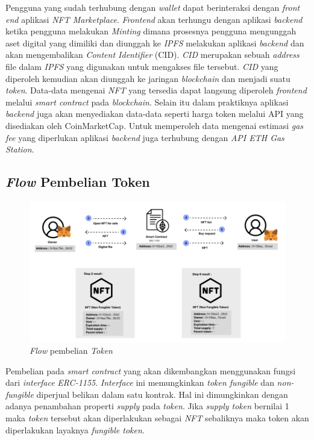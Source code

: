 Pengguna yang sudah terhubung dengan \emph{wallet} dapat berinteraksi dengan \emph{front end} aplikasi \emph{NFT Marketplace}. \emph{Frontend} akan terhungu dengan aplikasi \emph{backend} ketika pengguna melakukan \emph{Minting} dimana prosesnya pengguna mengunggah aset digital yang dimiliki dan diunggah ke \emph{IPFS} melakukan aplikasi \emph{backend} dan akan mengembalikan \emph{Content Identifier} (CID). \emph{CID} merupakan sebuah \emph{address} file dalam \emph{IPFS} yang digunakan untuk mengakses file tersebut. \emph{CID} yang diperoleh kemudian akan diunggah ke jaringan \emph{blockchain} dan menjadi suatu \emph{token}. Data-data mengenai \emph{NFT} yang tersedia dapat langsung diperoleh \emph{frontend} melalui \emph{smart contract} pada \emph{blockchain}. Selain itu dalam praktiknya aplikasi \emph{backend} juga akan menyediakan data-data seperti harga token melalui API yang disediakan oleh CoinMarketCap. Untuk memperoleh data mengenai estimasi \emph{gas fee} yang diperlukan aplikasi \emph{backend} juga terhubung dengan \emph{API ETH Gas Station}.

\subsection{\emph{Flow} Pembelian Token}

\begin{figure} [H] \centering
  \includegraphics[scale=0.45]{gambar/img-nft-buy.png}
  \caption{\emph{Flow} pembelian \emph{Token}}
  \label{fig:Buy}
\end{figure}

Pembelian pada \emph{smart contract} yang akan dikembangkan menggunakan fungsi dari \emph{interface} \emph{ERC-1155}. \emph{Interface} ini memungkinkan \emph{token fungible} dan \emph{non-fungible} diperjual belikan dalam satu kontrak. Hal ini dimungkinkan dengan adanya penambahan properti \emph{supply} pada \emph{token}. Jika \emph{supply token} bernilai 1 maka \emph{token} tersebut akan diperlakukan sebagai \emph{NFT} sebaliknya maka token akan diperlakukan layaknya \emph{fungible token}.  

